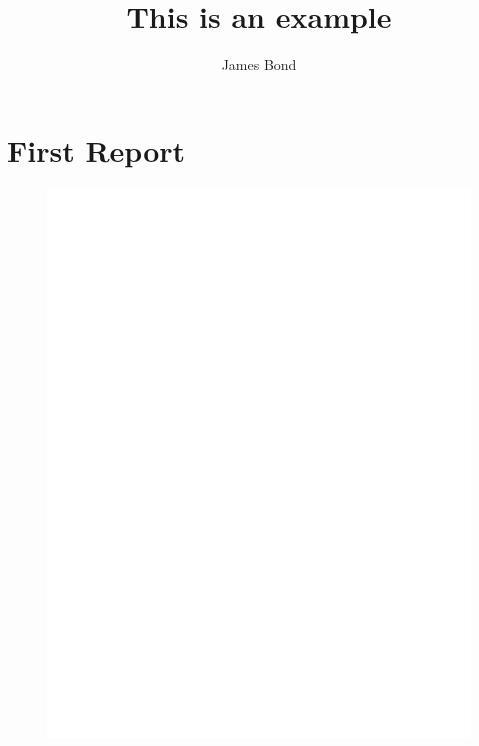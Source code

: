 \documentclass[10pt,twocolumn]{article}
\begin{document}
\title{This is an example}

\author{James Bond}

\maketitle

\section{First Report}

\begin{figure}

\includegraphics[]{test.pdf}

\end{figure}
\end{document}
